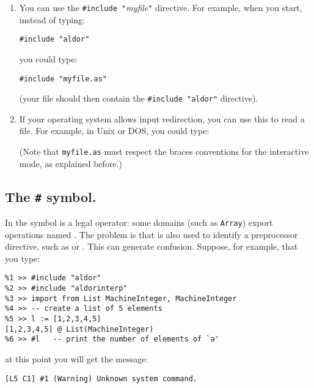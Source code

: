 \begin{enumerate}
\item You can use the \verb'#include "'{\em myfile\/}\verb'"' directive.
For example, when you start, instead of typing:

{\small
\begin{verbatim}
#include "aldor"
\end{verbatim}
}

you could type:

{\small
\begin{verbatim}
#include "myfile.as"
\end{verbatim}
}


(your file should then contain the \verb'#include "aldor"' directive).

\item If your operating system allows input redirection, you can use 
this to read a file.  For example, in Unix or DOS, you could type:

\osprompt {}

(Note that \verb"myfile.as" must respect the braces conventions for the
interactive mode, as explained before.)

\end{enumerate}

\subsection{The {\tt \#} symbol.}

In \asharp{} the \ttin{\#} symbol is a legal operator: some domains
(such as \verb"Array") export operations named \ttin{\#}.
The problem is that \ttin{\#} is also used to identify a preprocessor
directive, such as  or . This can generate
confusion. Suppose, for example, that you type:

{\small
\begin{verbatim}
%1 >> #include "aldor"
%2 >> #include "aldorinterp"
%3 >> import from List MachineInteger, MachineInteger
%4 >> -- create a list of 5 elements
%5 >> l := [1,2,3,4,5]
[1,2,3,4,5] @ List(MachineInteger)
%6 >> #l   -- print the number of elements of `a'
\end{verbatim}
}


at this point you will get the message:
{\small
\begin{verbatim}
[L5 C1] #1 (Warning) Unknown system command.
\end{verbatim}
}


